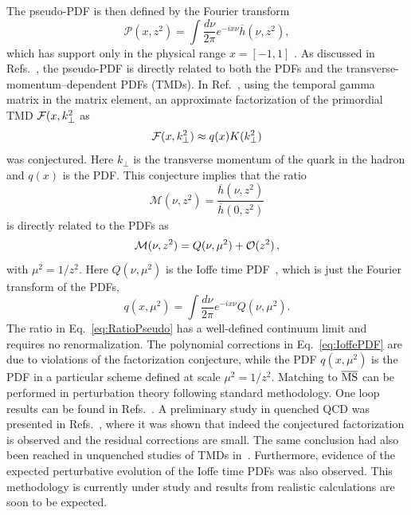 The pseudo-PDF is then defined by the Fourier transform
%
\begin{equation}
{\mathcal P}(x,z^2)=\int \frac{d\nu}{2\pi} e^{-ix\nu} \overline{h}(\nu,z^2),
\end{equation}
which has support only in the physical range 
$x=[-1,1]$ \cite{Radyushkin:2016hsy,Radyushkin:2017cyf}. 
%
As discussed in Refs.~\cite{Radyushkin:2016hsy,Radyushkin:2017cyf}, the pseudo-PDF 
is directly related to both the PDFs and the 
transverse-momentum--dependent PDFs (TMDs).
%
In Ref.~\cite{Radyushkin:2017cyf}, using the temporal gamma matrix in the matrix 
element, an approximate factorization of the primordial TMD ${\cal F}(x,k_\perp^2$ as 
$$
{\cal F}(x,k_\perp^2)\approx q(x) K(k_\perp^2)$$
was conjectured. Here $k_\perp$ is the transverse momentum of the quark in the hadron and $q(x)$ is the PDF. This conjecture 
implies that the ratio
%
\begin{equation}
{\mathcal M}(\nu,z^2) =\frac{\overline h(\nu,z^2)}{\overline h(0,z^2)}
\label{eq:RatioPseudo}
\end{equation}
is directly related to the PDFs as 
\begin{equation}
{\mathcal M}(\nu,z^2) =Q(\nu,\mu^2) + {\cal O}(z^2)\,,
\label{eq:IoffePDF}
\end{equation}
with $\mu^2=1/z^2$.
%
Here $Q(\nu,\mu^2)$ is the Ioffe time PDF~\cite{Ioffe:1969kf,Braun:1994jq}, 
which is just the Fourier transform of the PDFs,
\begin{equation}
{q}(x,\mu^2)=\int \frac{d\nu}{2\pi} e^{-ix\nu} Q(\nu,\mu^2).
\end{equation}
%
The ratio in Eq.~\eqref{eq:RatioPseudo} has a well-defined continuum 
limit and requires no renormalization. 
%
The polynomial corrections in Eq.~\eqref{eq:IoffePDF} are due to violations of 
the factorization conjecture, while the PDF ${q}(x,\mu^2)$ is the PDF in a 
particular scheme defined at scale $\mu^2=1/z^2$. Matching to $\overline{\rm MS}$ 
can be performed in perturbation theory following standard methodology. 
%
One loop results can be found in Refs.~\cite{Ji:2017rah,Radyushkin:2017lvu}.
%
A preliminary study  in quenched QCD was presented in Refs.~\cite{Orginos:2017kos,Karpie:2017bzm}, 
where it was shown that indeed the conjectured factorization is observed and 
the residual corrections are small. The same conclusion had also been reached in unquenched studies of TMDs in~\cite{Musch:2010ka}.
%
Furthermore,  evidence of the expected perturbative evolution of the Ioffe time PDFs was also observed. 
%
This methodology  is currently under study and results from realistic calculations are soon to be expected.

